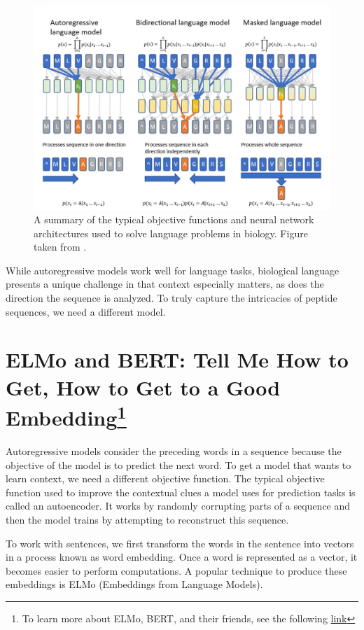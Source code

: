 \documentclass{SBCbookchapter}
\begin{document}
\begin{figure}[!h]
	\centerline{\includegraphics[scale=0.7]{rob_long_3.png}}
	\caption{A summary of the typical objective functions and neural network architectures used to solve language problems in biology. Figure taken from \cite{bepler_learning_2021}. }
	\label{figthree}
\end{figure}

While autoregressive models work well for language tasks, biological language presents a unique challenge in that context especially matters, as does the direction the sequence is analyzed. To truly 
capture the intricacies of peptide sequences, we need a different model. 

\section{ELMo and BERT: Tell Me How to Get, How to Get to a Good \\ Embedding\footnote{To learn more about ELMo, BERT, and their friends, see the following 
\href{https://www.youtube.com/watch?v=b2rBhpVDzO8&ab_channel=SesameStreet}{link}}}

Autoregressive models consider the preceding words in a sequence because the objective of the model is to predict the next word. To get a model that wants to learn context, we need a different objective 
function. The typical objective function used to improve the contextual clues a model uses for prediction tasks is called an autoencoder. It works by randomly corrupting parts of a sequence and then the 
model trains by attempting to reconstruct this sequence. 

To work with sentences, we first transform the words in the sentence into vectors in a process known as word embedding. Once a word is represented as a vector, it becomes easier to perform computations. 
A popular technique to produce these embeddings is ELMo (Embeddings from Language Models). 
\end{document}
